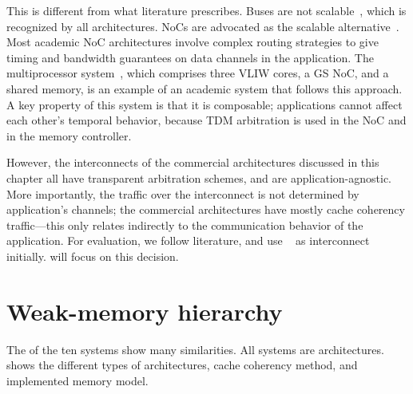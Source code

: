 This is different from what literature prescribes.
Buses are not scalable~\cite{guerrier:noc}, which is recognized by all architectures.
\Acp{NoC} are advocated as the scalable alternative~\cite{goossens:aethereal,wolkotte:phd}.
Most academic \ac{NoC} architectures involve complex routing strategies to give timing and bandwidth guarantees on data channels in the application.
The \CoMPSoC multiprocessor system~\cite{hansson:compsoc}, which comprises three \ac{VLIW} cores, a \acl{GS} \ac{NoC}, and a shared memory, is an example of an academic system that follows this approach.
A key property of this system is that it is composable; applications cannot affect each other's temporal behavior, because \ac{TDM} arbitration is used in the \ac{NoC} and in the memory controller.


However, the interconnects of the commercial architectures discussed in this chapter all have transparent arbitration schemes, and are application-agnostic.
More importantly, the traffic over the interconnect is not determined by application's channels; the commercial architectures have mostly cache coherency traffic---this only relates indirectly to the communication behavior of the application.
For evaluation, we follow literature, and use \aethereal*~\cite{goossens:aethereal} as interconnect initially.
 will focus on this decision.


\section{Weak-memory hierarchy}
\label{s:trends:memory}

The  of the ten systems show many similarities.
All systems are  architectures.
 shows the different types of architectures, cache coherency method, and implemented memory model.

